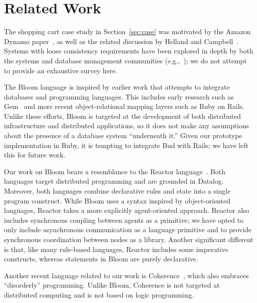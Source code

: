 \section{Related Work}
\label{sec:relwork}
The shopping cart case study in Section~\ref{sec:case} was motivated by the
Amazon Dynamo paper~\cite{dynamo}, as well as the related discussion by Helland
and Campbell~\cite{quicksand}. Systems with loose consistency requirements have
been explored in depth by both the systems and database management communities
(e.g.,~\cite{sagas,leases,dangers,bayou}); we do not attempt to provide
an exhaustive survey here.

The Bloom language is inspired by earlier work that attempts to integrate
databases and programming languages.  This includes early research such as
Gem~\cite{gem} and more recent object-relational mapping layers such as Ruby on
Rails.  Unlike these efforts, Bloom is targeted at the development of both
distributed infrastructure and distributed applications, so it does not make any
assumptions about the presence of a database system ``underneath it.''  Given
our prototype implementation in Ruby, it is tempting to integrate Bud with
Rails; we have left this for future work.

Our work on Bloom bears a resemblance to the Reactor
language~\cite{reactors}. Both languages target distributed programming and are
grounded in Datalog. Moreover, both languages combine declarative rules and
state into a single program construct. While Bloom uses a syntax inspired by
object-oriented languages, Reactor takes a more explicitly agent-oriented
approach. Reactor also includes synchronous coupling between agents as a
primitive; we have opted to only include asynchronous communication as a
language primitive and to provide synchronous coordination between nodes as a
library. Another significant different is that, like many rule-based languages,
Reactor includes some imperative constructs, whereas statements in Bloom are
purely declarative.

Another recent language related to our work is Coherence~\cite{coherence}, which
also embraces ``disorderly'' programming. Unlike Bloom, Coherence is not
targeted at distributed computing and is not based on logic programming.


